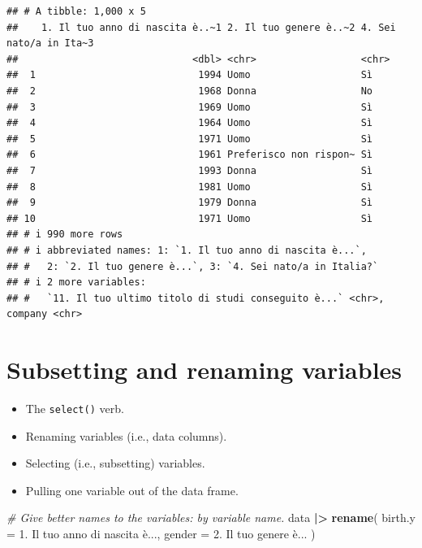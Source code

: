 \documentclass[
]{book}
\newenvironment{Shaded}{\begin{snugshade}}{\end{snugshade}}
\newcommand{\AttributeTok}[1]{\textcolor[rgb]{0.13,0.29,0.53}{#1}}
\newcommand{\CommentTok}[1]{\textcolor[rgb]{0.56,0.35,0.01}{\textit{#1}}}
\newcommand{\FunctionTok}[1]{\textcolor[rgb]{0.13,0.29,0.53}{\textbf{#1}}}
\newcommand{\NormalTok}[1]{#1}
\newcommand{\SpecialCharTok}[1]{\textcolor[rgb]{0.81,0.36,0.00}{\textbf{#1}}}
\newcommand{\StringTok}[1]{\textcolor[rgb]{0.31,0.60,0.02}{#1}}
\providecommand{\tightlist}{%
  \setlength{\itemsep}{0pt}\setlength{\parskip}{0pt}}
\begin{document}
\begin{verbatim}
## # A tibble: 1,000 x 5
##    1. Il tuo anno di nascita è..~1 2. Il tuo genere è..~2 4. Sei nato/a in Ita~3
##                              <dbl> <chr>                  <chr>                 
##  1                            1994 Uomo                   Sì                    
##  2                            1968 Donna                  No                    
##  3                            1969 Uomo                   Sì                    
##  4                            1964 Uomo                   Sì                    
##  5                            1971 Uomo                   Sì                    
##  6                            1961 Preferisco non rispon~ Sì                    
##  7                            1993 Donna                  Sì                    
##  8                            1981 Uomo                   Sì                    
##  9                            1979 Donna                  Sì                    
## 10                            1971 Uomo                   Sì                    
## # i 990 more rows
## # i abbreviated names: 1: `1. Il tuo anno di nascita è...`,
## #   2: `2. Il tuo genere è...`, 3: `4. Sei nato/a in Italia?`
## # i 2 more variables:
## #   `11. Il tuo ultimo titolo di studi conseguito è...` <chr>, company <chr>
\end{verbatim}

\hypertarget{subsetting-and-renaming-variables}{%
\section{Subsetting and renaming variables}\label{subsetting-and-renaming-variables}}

\begin{itemize}
\tightlist
\item
  The \texttt{select()} verb.
\item
  Renaming variables (i.e., data columns).
\item
  Selecting (i.e., subsetting) variables.
\item
  Pulling one variable out of the data frame.
\end{itemize}

\begin{Shaded}
\begin{Highlighting}[]
\CommentTok{\# Give better names to the variables: by variable name.}
\NormalTok{data }\SpecialCharTok{|\textgreater{}} 
  \FunctionTok{rename}\NormalTok{(}
    \AttributeTok{birth.y =} \StringTok{\textasciigrave{}}\AttributeTok{1. Il tuo anno di nascita è...}\StringTok{\textasciigrave{}}\NormalTok{,}
    \AttributeTok{gender =} \StringTok{\textasciigrave{}}\AttributeTok{2. Il tuo genere è...}\StringTok{\textasciigrave{}}
\NormalTok{  )}
\end{Highlighting}
\end{Shaded}
\end{document}

